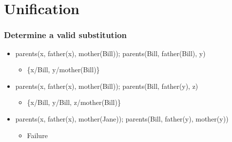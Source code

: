 \documentclass[compress, 9pt]{beamer}
\begin{document}
\section{Unification}
\label{sec-2}
\begin{frame}
\frametitle{Determine a valid substitution}
\label{sec-2-1}

\begin{itemize}
\item <1-> parents(x, father(x), mother(Bill));     parents(Bill, father(Bill), y)
\begin{itemize}
\item <2-> \{x/Bill, y/mother(Bill)\}
\end{itemize}
\item <3-> parents(x, father(x), mother(Bill));     parents(Bill, father(y), z)
\begin{itemize}
\item <4-> \{x/Bill, y/Bill, z/mother(Bill)\}
\end{itemize}
\item <5-> parents(x, father(x), mother(Jane));     parents(Bill, father(y), mother(y))
\begin{itemize}
\item <6-> Failure
\end{itemize}
\end{itemize}
\end{frame}
\end{document}
